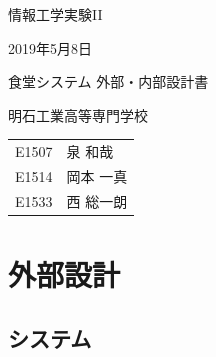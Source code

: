 \documentclass[a4paper]{ltjsarticle}
\begin{document}

\large
\vspace{-5.0cm}
\hspace{-1.0cm}
情報工学実験II

\hspace{-1.0cm}
2019年5月8日

\Huge
\vspace{1.0cm}
\begin{center}
    食堂システム 外部・内部設計書
\end{center}

\vspace{0.5cm}
\begin{center}
    \LARGE
    明石工業高等専門学校
\end{center}

\LARGE
\begin{center}
    \begin{tabular}{rl}
        E1507 & 泉 和哉 \\
        E1514 & 岡本 一真 \\
        E1533 & 西 総一朗
    \end{tabular}
\end{center}

\normalsize

\tableofcontents
\thispagestyle{empty}
\clearpage
\setcounter{page}{1}


\section{外部設計}
\subsection{システム}
\end{document}
